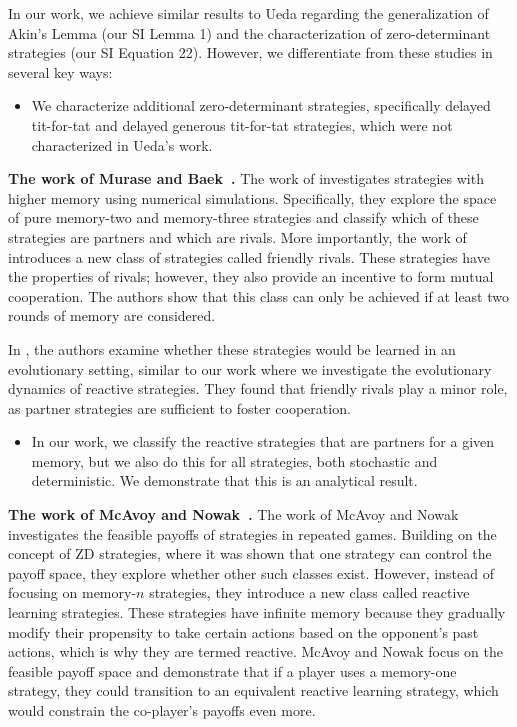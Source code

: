 \documentclass[11pt]{article}
\theoremstyle{plainCl1}
\theoremstyle{plainCl2}
\begin{document}
In our work, we achieve similar results to Ueda regarding the generalization of
Akin's Lemma (our SI Lemma 1) and the characterization of zero-determinant
strategies (our SI Equation 22). However, we differentiate from these studies in
several key ways:

\begin{itemize} 
\item We characterize additional zero-determinant strategies,
specifically delayed tit-for-tat and delayed generous tit-for-tat strategies,
which were not characterized in Ueda's work.
\end{itemize}


\noindent
{\bf The work of Murase and Baek~\cite{murase:SciRep:2020, Murase:PLoSCompBio:2023a}.}
The work of \cite{murase:SciRep:2020, Murase:PLoSCompBio:2023a} investigates
strategies with higher memory using numerical simulations. Specifically, they
explore the space of pure memory-two and memory-three strategies and classify
which of these strategies are partners and which are rivals. More importantly,
the work of \cite{murase:SciRep:2020} introduces a new class of strategies
called friendly rivals. These strategies have the properties of rivals; however,
they also provide an incentive to form mutual cooperation. The authors show that
this class can only be achieved if at least two rounds of memory are considered.

In \cite{Murase:PLoSCompBio:2023a}, the authors examine whether these strategies
would be learned in an evolutionary setting, similar to our work where we
investigate the evolutionary dynamics of reactive strategies. They found that
friendly rivals play a minor role, as partner strategies are sufficient to foster
cooperation.

\begin{itemize}
\item In our work, we classify the reactive strategies that are partners for a given
memory, but we also do this for all strategies, both stochastic and
deterministic. We demonstrate that this is an analytical result.
\end{itemize}

\noindent
{\bf The work of McAvoy and Nowak~\cite{mcavoy:PRSA:2019}.}
The work of McAvoy and Nowak~\cite{mcavoy:PRSA:2019} investigates the feasible
payoffs of strategies in repeated games. Building on the concept of ZD
strategies, where it was shown that one strategy can control the payoff space,
they explore whether other such classes exist. However, instead of focusing on
memory-\(n\) strategies, they introduce a new class called reactive learning
strategies. These strategies have infinite memory because they gradually modify
their propensity to take certain actions based on the opponent's past actions,
which is why they are termed reactive. McAvoy and Nowak focus on the feasible
payoff space and demonstrate that if a player uses a memory-one strategy, they
could transition to an equivalent reactive learning strategy, which would
constrain the co-player's payoffs even more.
\end{document}
